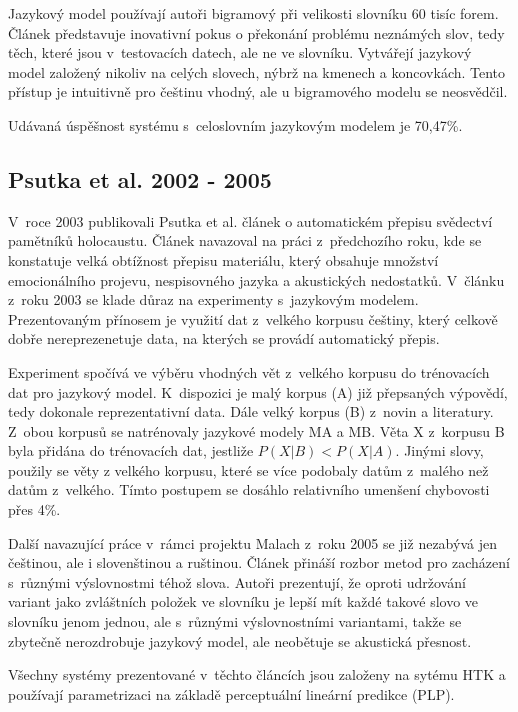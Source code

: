 Jazykový model používají autoři bigramový při velikosti slovníku 60 tisíc forem.
Článek představuje inovativní pokus o překonání problému neznámých slov, tedy
těch, které jsou v~testovacích datech, ale ne ve slovníku. Vytvářejí jazykový
model založený nikoliv na celých slovech, nýbrž na kmenech a koncovkách. Tento
přístup je intuitivně pro češtinu vhodný, ale u bigramového modelu se
neosvědčil.

Udávaná úspěšnost systému s~celoslovním jazykovým modelem je 70,47\%.

\subsection{Psutka et al. 2002 - 2005}

V~roce 2003 publikovali Psutka et al. článek o automatickém přepisu svědectví
pamětníků holocaustu\cite{psutka2003large}. Článek navazoval na práci
z~předchozího roku\cite{psutka2002automatic}, kde se konstatuje velká obtížnost
přepisu materiálu, který obsahuje množství emocionálního projevu, nespisovného
jazyka a akustických nedostatků. V~článku z~roku 2003 se klade důraz na
experimenty s~jazykovým modelem. Prezentovaným přínosem je využití dat z~velkého
korpusu češtiny, který celkově dobře nereprezenetuje data, na kterých se provádí
automatický přepis.

Experiment spočívá ve výběru vhodných vět z~velkého korpusu do trénovacích dat
pro jazykový model. K~dispozici je malý korpus (A) již přepsaných výpovědí, tedy
dokonale reprezentativní data. Dále velký korpus (B) z~novin a literatury.
Z~obou korpusů se natrénovaly jazykové modely MA a MB. Věta X z~korpusu B byla
přidána do trénovacích dat, jestliže $P(X|B) < P(X|A)$. Jinými slovy, použily se
věty z velkého korpusu, které se více podobaly datům z~malého než datům
z~velkého. Tímto postupem se dosáhlo relativního umenšení chybovosti přes 4\%.

Další navazující práce v~rámci projektu Malach\cite{psutka2005automatic} z~roku
2005 se již nezabývá jen češtinou, ale i slovenštinou a ruštinou. Článek
přináší rozbor metod pro zacházení s~různými výslovnostmi téhož slova. Autoři
prezentují, že oproti udržování variant jako zvláštních položek ve slovníku je
lepší mít každé takové slovo ve slovníku jenom jednou, ale s~různými
výslovnostními variantami, takže se zbytečně nerozdrobuje jazykový model, ale
neobětuje se akustická přesnost.

Všechny systémy prezentované v~těchto článcích jsou založeny na sytému HTK a
používají parametrizaci na základě perceptuální lineární predikce (PLP).


